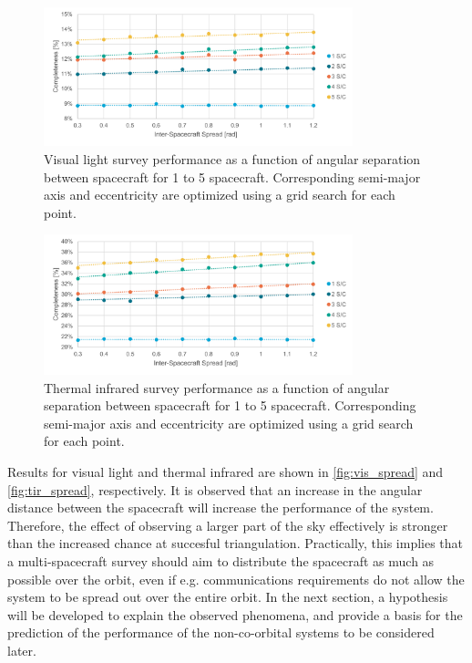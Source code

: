 \begin{figure}[htbp]
 \centering
 \includegraphics[width=0.8\textwidth]{img/vis_spread.pdf}
 \caption{Visual light survey performance as a function of angular separation between spacecraft for 1 to 5 spacecraft. Corresponding semi-major axis and eccentricity are optimized using a grid search for each point.}
 \label{fig:vis_spread}
\end{figure}

\begin{figure}[htbp]
 \centering
 \includegraphics[width=0.8\textwidth]{img/tir_spread.pdf}
 \caption{Thermal infrared survey performance as a function of angular separation between spacecraft for 1 to 5 spacecraft. Corresponding semi-major axis and eccentricity are optimized using a grid search for each point.}
 \label{fig:tir_spread}
\end{figure}

Results for visual light and thermal infrared are shown in \autoref{fig:vis_spread} and \autoref{fig:tir_spread}, respectively. It is observed that an increase in the angular distance between the spacecraft will increase the performance of the system. Therefore, the effect of observing a larger part of the sky effectively is stronger than the increased chance at succesful triangulation. Practically, this implies that a multi-spacecraft survey should aim to distribute the spacecraft as much as possible over the orbit, even if e.g. communications requirements do not allow the system to be spread out over the entire orbit. In the next section, a hypothesis will be developed to explain the observed phenomena, and provide a basis for the prediction of the performance of the non-co-orbital systems to be considered later.

